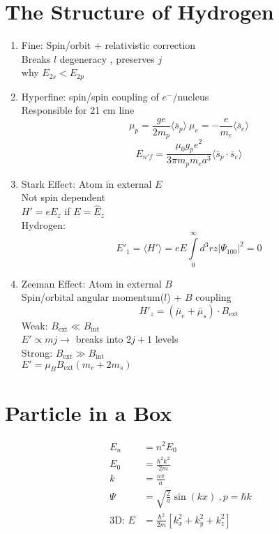 \documentclass[10pt,a4paper]{article}
\begin{document}
\section{The Structure of Hydrogen} %
\label{sec:the_structure_of_hydrogen}
\begin{enumerate}
    \item Fine: Spin/orbit + relativistic correction\\
    Breaks $l$ degeneracy , preserves $j$\\
    why $E_{2s} < E_{2p}$
    \item Hyperfine: spin/spin coupling of $e^-/$nucleus\\
    Responsible for 21 cm line\\
    \begin{equation}
        \mu_p = \frac{ge}{2m_p} \langle \bar{s}_p \rangle ~ \mu_e = -\frac{e}{m_e} \langle \bar{s}_e \rangle
    \end{equation}
    \begin{equation}
        E_{n'f} = \frac{\mu_0 g_p e^2}{3 \pi m_p m_e a^3} \langle \bar{s}_p \cdot \bar{s}_e \rangle
    \end{equation}
    \item Stark Effect: Atom in external $E$\\
    Not spin dependent\\
    $H' = eE_z$ if $E = \hat{E}_z$\\
    Hydrogen:
    \begin{equation}
        E'_1= \langle H' \rangle = eE\int \limits_0^\infty d^3rz | \Psi_{100} | ^2 = 0
    \end{equation}
    \item Zeeman Effect: Atom in external $B$\\
    Spin/orbital angular momentum($l$) + $B$ coupling
    \begin{equation}
        H'_z = (\bar{\mu}_e+ \bar{\mu}_s) \cdot B_{\textrm{ext}}
    \end{equation}
    Weak: $B_{\textrm{ext}} \ll B_{\textrm{int}}$\\
    $E'\propto mj \rightarrow$ breaks into $2j+1$ levels\\
    Strong: $B_{\textrm{ext}} \gg B_{\textrm{int}}$\\
    $E' = \mu_B B_{\textrm{ext}} (m_e + 2m_s)$
\end{enumerate}

\section{Particle in a Box} %
\label{sec:particle_in_a_box}
\begin{align}
    E_n &= n^2E_0\\
    E_0 &= \frac{\hbar^2 k^2}{2m}\\
    k &= \frac{n\pi}{a}\\
    \Psi &= \sqrt{\frac{2}{a}} \sin (kx)~, p=\hbar k\\
    \textrm{3D: }E &= \frac{\hbar^2}{2m} [k_x^2 + k_y^2 + k_z^2]
\end{align}
\end{document}
